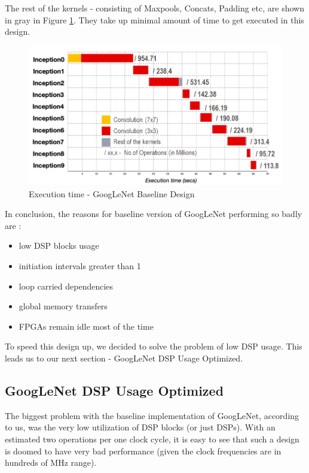 The rest of the kernels - consisting of Maxpools, Concats, Padding etc, are shown in gray in Figure \ref{fig:GoogLeNetBaseline_Runtime_Graph}. They take up minimal amount of time to get executed in this design.

\begin{figure}[!htb]
  \includegraphics[width=\textwidth,height=\textheight,keepaspectratio]{img/GoogLeNetBaseline_Runtime_Graph.png}
  \caption{Execution time - GoogLeNet Baseline Design}
  \label{fig:GoogLeNetBaseline_Runtime_Graph}
\end{figure}


In conclusion, the reasons for baseline version of GoogLeNet performing so badly are :
\begin{itemize}
    \item low DSP blocks usage
    \item initiation intervals greater than 1
    \item loop carried dependencies 
    \item global memory transfers
    \item FPGAs remain idle most of the time
\end{itemize}

To speed this design up, we decided to solve the problem of low DSP usage. This leads us to our next section - GoogLeNet DSP Usage Optimized.

\subsection{GoogLeNet DSP Usage Optimized}
The biggest problem with the baseline implementation of GoogLeNet, according to us, was the very low utilization of DSP blocks (or just DSPs). With an estimated two operations per one clock cycle, it is easy to see that such a design is doomed to have very bad performance (given the clock frequencies are in hundreds of MHz range).
 
